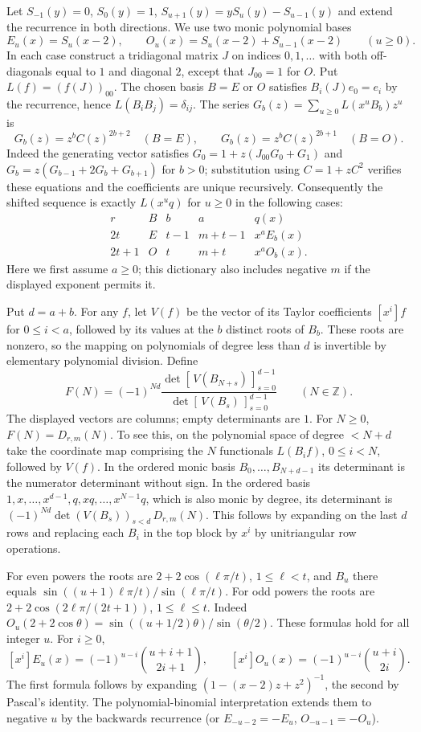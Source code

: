 \documentclass[11pt,a4paper]{article}
\theoremstyle{definition}\newtheorem{problem}[theorem]{Auxiliary problem}
\theoremstyle{remark}\newtheorem*{remark}{Remark}
\begin{document}
Let $S_{-1}(y)=0$, $S_0(y)=1$, $S_{u+1}(y)=yS_u(y)-S_{u-1}(y)$ and extend the recurrence in both directions.
We use two monic polynomial bases
\[
E_u(x)=S_u(x-2),\qquad O_u(x)=S_u(x-2)+S_{u-1}(x-2)\qquad (u\ge0).
\]
In each case construct a tridiagonal matrix $J$ on indices $0,1,\ldots$ with both off-diagonals equal to $1$ and diagonal $2$, except that $J_{00}=1$ for $O$. Put $L(f)=(f(J))_{00}$. The chosen basis $B=E$ or $O$ satisfies $B_i(J)e_0=e_i$ by the recurrence, hence $L(B_i B_j)=\delta_{ij}$. The series $G_b(z)=\sum_{u\ge0}L(x^u B_b)z^u$ is
\[
 G_b(z)=z^b C(z)^{2b+2}\quad(B=E),\qquad
 G_b(z)=z^b C(z)^{2b+1}\quad(B=O).
\]
Indeed the generating vector satisfies $G_0=1+z(J_{00}G_0+G_1)$ and $G_b=z(G_{b-1}+2G_b+G_{b+1})$ for $b>0$; substitution using $C=1+zC^2$ verifies these equations and the coefficients are unique recursively. Consequently the shifted sequence is exactly $L(x^u q)$ for $u\ge0$ in the following cases:
\[
\begin{array}{c|cccc}
r&B&b&a&q(x)\\\hline
2t&E&t-1&m+t-1&x^a E_b(x)\\
2t+1&O&t&m+t&x^a O_b(x).
\end{array}
\]
Here we first assume $a\ge0$; this dictionary also includes negative $m$ if the displayed exponent permits it.

Put $d=a+b$. For any $f$, let $V(f)$ be the vector of its Taylor coefficients $[x^i]f$ for $0\le i<a$, followed by its values at the $b$ distinct roots of $B_b$. These roots are nonzero, so the mapping on polynomials of degree less than $d$ is invertible by elementary polynomial division. Define
\[
F(N)=(-1)^{Nd}
\frac{\det[\,V(B_{N+s})\,]_{s=0}^{d-1}}{\det[\,V(B_s)\,]_{s=0}^{d-1}}
\qquad (N\in\mathbb Z).
\]
The displayed vectors are columns; empty determinants are $1$. For $N\ge0$, $F(N)=D_{r,m}(N)$. To see this, on the polynomial space of degree $<N+d$ take the coordinate map comprising the $N$ functionals $L(B_i f)$, $0\le i<N$, followed by $V(f)$. In the ordered monic basis $B_0,\ldots,B_{N+d-1}$ its determinant is the numerator determinant without sign. In the ordered basis $1,x,\ldots,x^{d-1},q,xq,\ldots,x^{N-1}q$, which is also monic by degree, its determinant is $(-1)^{Nd}\det(V(B_s))_{s<d}\,D_{r,m}(N)$. This follows by expanding on the last $d$ rows and replacing each $B_i$ in the top block by $x^i$ by unitriangular row operations.

For even powers the roots are $2+2\cos(\ell\pi/t)$, $1\le\ell<t$, and $B_u$ there equals $\sin((u+1)\ell\pi/t)/\sin(\ell\pi/t)$. For odd powers the roots are $2+2\cos(2\ell\pi/(2t+1))$, $1\le\ell\le t$. Indeed $O_u(2+2\cos\theta)=\sin((u+1/2)\theta)/\sin(\theta/2)$. These formulas hold for all integer $u$. For $i\ge0$,
\[
 [x^i]E_u(x)=(-1)^{u-i}\binom{u+i+1}{2i+1},
 \qquad [x^i]O_u(x)=(-1)^{u-i}\binom{u+i}{2i}.
\]
The first formula follows by expanding $(1-(x-2)z+z^2)^{-1}$, the second by Pascal's identity. The polynomial-binomial interpretation extends them to negative $u$ by the backwards recurrence (or $E_{-u-2}=-E_u$, $O_{-u-1}=-O_u$).
\end{document}
